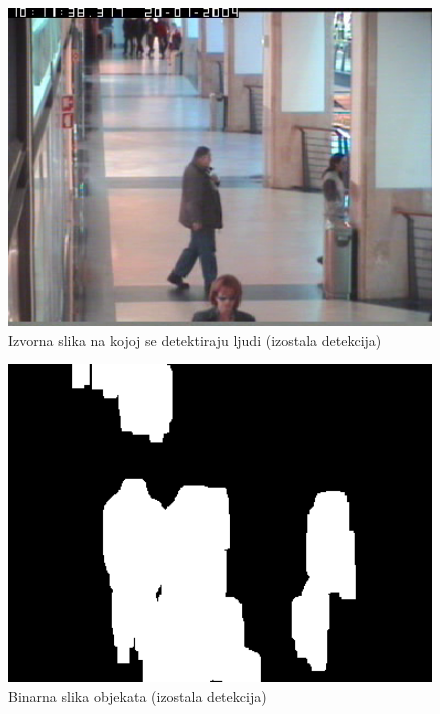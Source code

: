 \documentclass[times, utf8, seminar, numeric]{fer}
\begin{document}
\begin{figure}
\centering
\includegraphics[width=1\textwidth]{otok_original.png}
\caption{Izvorna slika na kojoj se detektiraju ljudi (izostala detekcija)}
\label{otok_original}
\end{figure}

\begin{figure}
\centering
\includegraphics[width=1\textwidth]{otok_fore.png}
\caption{Binarna slika objekata (izostala detekcija)}
\label{otok_fore}
\end{figure}
\end{document}
